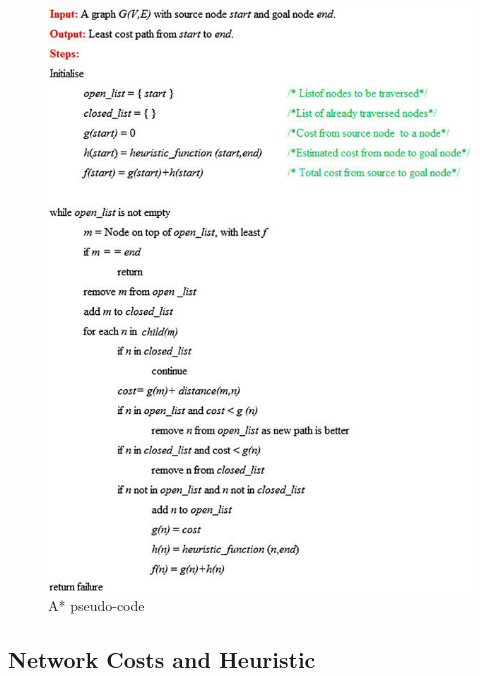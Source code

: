 \documentclass[11pt]{report}
\begin{document}
\begin{figure}[h!]
  \centering
  \includegraphics[width=0.78\linewidth]{a-starAlg.jpg}
  \caption{A* pseudo-code \autocite{sharma2012determining}}
  \label{fig:4}
\end{figure}

\subsection{Network Costs and Heuristic}
\end{document}
